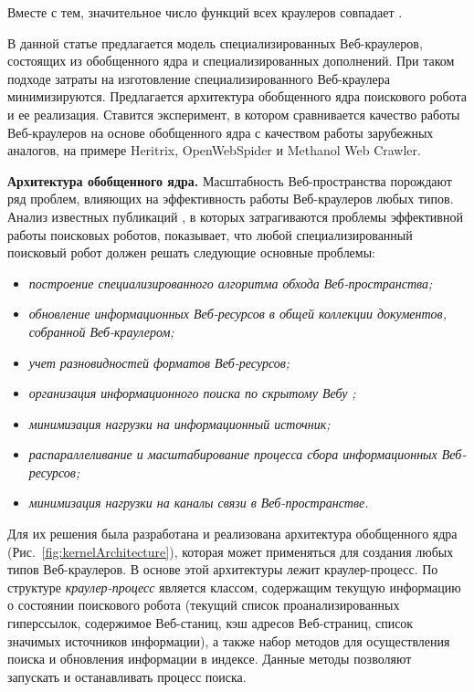 Вместе с тем, значительное число функций всех краулеров совпадает \cite{ArasuChoGM,Bar-Ilan,ChoGM,NajorkHeydon}.

В данной статье предлагается модель специализированных Веб-краулеров, состоящих из обобщенного ядра и специализированных дополнений. При таком подходе затраты на изготовление специализированного Веб-краулера минимизируются. Предлагается архитектура обобщенного ядра поискового робота и ее реализация. Ставится эксперимент, в котором сравнивается качество работы Веб-краулеров на основе обобщенного ядра с качеством работы зарубежных аналогов, на примере Heritrix, OpenWebSpider и Methanol Web Crawler.

\textbf{Архитектура обобщенного ядра.} Масштабность Веб-пространства порождают ряд проблем, влияющих на эффективность работы Веб-краулеров любых типов. Анализ известных публикаций \cite{ArasuChoGM,ChoGM,NajorkHeydon,RaghavanGM}, в которых затрагиваются проблемы эффективной работы поисковых роботов, показывает, что любой специализированный поисковый робот должен решать следующие основные проблемы:
\begin{itemize}
	\item \textit{построение специализированного алгоритма обхода Веб-пространства;}
	\item \textit{обновление информационных Веб-ресурсов в общей коллекции документов, собранной Веб-краулером;}
	\item \textit{учет разновидностей форматов Веб-ресурсов;}
	\item \textit{организация информационного поиска по скрытому Вебу} \cite{RaghavanGM}\textit{;}
	\item \textit{минимизация нагрузки на информационный источник;}
	\item \textit{распараллеливание и масштабирование процесса сбора информационных Веб-ресурсов;}
	\item \textit{минимизация нагрузки на каналы связи в Веб-пространстве.}
\end{itemize}

Для их решения была разработана и реализована архитектура обобщенного ядра (Рис.~\cref{fig:kernelArchitecture}), которая может применяться для создания любых типов Веб-краулеров. В основе этой архитектуры лежит краулер-процесс. По структуре \textit{краулер-процесс} является классом, содержащим текущую информацию о состоянии поискового робота (текущий список проанализированных гиперссылок, содержимое Веб-станиц, кэш адресов Веб-страниц, список значимых источников информации), а также набор методов для осуществления поиска и обновления информации в индексе. Данные методы позволяют запускать и останавливать процесс поиска.


